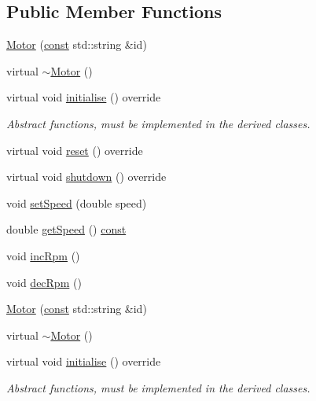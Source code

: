 \subsection*{Public Member Functions}
\begin{DoxyCompactItemize}
\item 
\hyperlink{class_motor_aade6af850e0177846336ddd136b1f2c9}{Motor} (\hyperlink{functions__c_8js_afacfd9c985d225bb07483b887a801b6f}{const} std\+::string \&id)
\item 
virtual \hyperlink{class_motor_a3135cf1bc9a3c68e1db0214c00a2b50f}{$\sim$\+Motor} ()
\item 
virtual void \hyperlink{class_motor_a7b47a09309764fdaeb8d6e6b2cac5c07}{initialise} () override
\begin{DoxyCompactList}\small\item\em Abstract functions, must be implemented in the derived classes. \end{DoxyCompactList}\item 
virtual void \hyperlink{class_motor_a0d0d43531b4b8b9d37fb8f936dd0f53c}{reset} () override
\item 
virtual void \hyperlink{class_motor_a8ef8df58afeba551f02b8e4afbd23c50}{shutdown} () override
\item 
void \hyperlink{class_motor_a4aece812dc94b008a874e4b38c3a3863}{set\+Speed} (double speed)
\item 
double \hyperlink{class_motor_adb1bb79029d707698d255fb3ce0e06f3}{get\+Speed} () \hyperlink{functions__c_8js_afacfd9c985d225bb07483b887a801b6f}{const} 
\item 
void \hyperlink{class_motor_a93a4de89dd6f493c165137a78e3d97b4}{inc\+Rpm} ()
\item 
void \hyperlink{class_motor_ac271f30175d294a9d27d50193840d61e}{dec\+Rpm} ()
\item 
\hyperlink{class_motor_aade6af850e0177846336ddd136b1f2c9}{Motor} (\hyperlink{functions__c_8js_afacfd9c985d225bb07483b887a801b6f}{const} std\+::string \&id)
\item 
virtual \hyperlink{class_motor_a3135cf1bc9a3c68e1db0214c00a2b50f}{$\sim$\+Motor} ()
\item 
virtual void \hyperlink{class_motor_af499f6ed70a5f8a7f57b08c08b0c381f}{initialise} () override
\begin{DoxyCompactList}\small\item\em Abstract functions, must be implemented in the derived classes. \end{DoxyCompactList}\item 

\end{DoxyCompactItemize}
